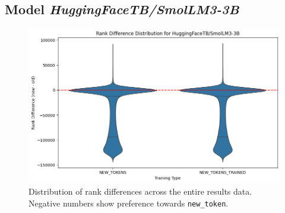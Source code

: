\subsection{Model \textit{HuggingFaceTB/SmolLM3-3B}}
\begin{figure}[H]
    \centering
    \includegraphics[width=1\textwidth]{Figures//Appendix/violin_smol3B.png}
    \caption[\text{ }\text{ }Distribution of Rank Differences for model \textit{SmolLM3-3B}]{Distribution of rank differences across the entire results data. Negative numbers show preference towards \texttt{new\_token}.}
    \label{annex:fig:violin_rank_dist:smol3B}
\end{figure}
